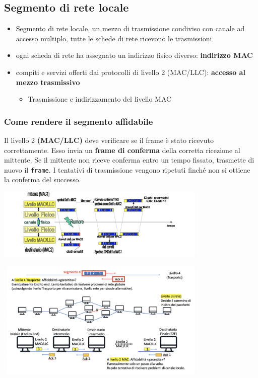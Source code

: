 \documentclass{article}
\begin{document}
\subsection{Segmento di rete locale}
\begin{itemize}
    \item Segmento di rete locale, un mezzo di trasmissione condiviso con canale ad accesso multiplo, tutte le schede di rete ricevono le trasmissioni
    \item ogni scheda di rete ha assegnato un indirizzo fisico diverso: \textbf{indirizzo MAC}
    \item compiti e servizi offerti dai protocolli di livello 2 (MAC/LLC): \textbf{accesso al mezzo trasmissivo}
    \begin{itemize}
        \item Trasmissione e indirizzamento del livello MAC
    \end{itemize}
\end{itemize}

\subsubsection{Come rendere il segmento affidabile}
Il livello 2 \textbf{(MAC/LLC)} deve verificare se il frame è stato ricevuto correttamente. Esso invia un \textbf{frame di conferma} della corretta ricezione al mittente. Se il mittente non riceve conferma entro un tempo fissato, trasmette di nuovo il \texttt{frame}. I tentativi di trasmissione vengono ripetuti finché non si ottiene la conferma del successo.
\begin{center}
    \includegraphics[width=10cm]{img/esFrame.png}
\end{center}
\begin{center}
    \includegraphics[width=10cm]{img/esFrame2.png}
\end{center}
\end{document}
